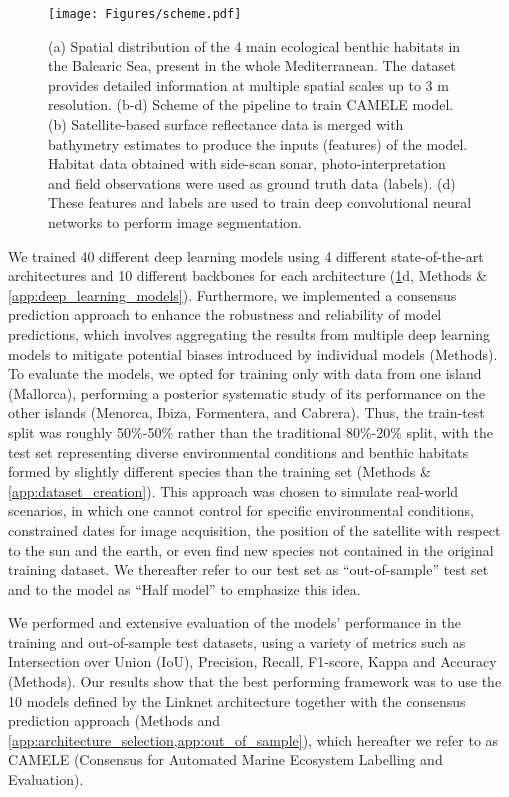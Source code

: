 \begin{figure}[H]
    \centering
    \texttt{[image: Figures/scheme.pdf]}
    \caption{(a) Spatial distribution of the 4 main ecological benthic habitats
        in the Balearic Sea, present in the whole Mediterranean. The dataset
        provides
        detailed information at multiple spatial scales up to 3 m resolution.
        (b-d)
        Scheme of the pipeline to train CAMELE model. (b) Satellite-based
        surface
        reflectance data is merged with bathymetry estimates to produce the
        inputs
        (features) of the model. Habitat data obtained with side-scan sonar,
        photo-interpretation and field observations were used as ground truth
        data
        (labels). (d) These features and labels are used to train deep
        convolutional
        neural networks to perform image segmentation.}
    \label{fig:scheme}
\end{figure}

We trained 40 different deep learning models using 4
different state-of-the-art architectures and 10 different backbones for each
architecture (\cref{fig:scheme}d, Methods \& \cref{app:deep_learning_models}).
Furthermore, we implemented a consensus prediction approach to enhance the
robustness and reliability of model predictions, which involves aggregating the
results from multiple deep learning models to mitigate potential biases
introduced by individual models (Methods). To evaluate the models, we opted for
training only with data from
one island (Mallorca), performing a posterior systematic study of its
performance on the other islands (Menorca, Ibiza, Formentera, and Cabrera).
Thus, the train-test split was roughly 50\%-50\% rather than the traditional
80\%-20\% split, with the test set representing diverse environmental
conditions and benthic habitats formed by slightly different species than
the training set (Methods \& \cref{app:dataset_creation}). This approach
was
chosen to simulate real-world scenarios, in which one cannot control for
specific environmental conditions, constrained dates for image acquisition, the
position of the satellite with respect to the sun and the earth, or even find
new species not contained in the original training dataset. We thereafter refer
to our test set as ``out-of-sample'' test set and to the model as ``Half
model'' to emphasize this idea.

We performed and extensive evaluation of the models' performance in the
training and out-of-sample test datasets, using a variety of metrics such as
Intersection over Union (IoU), Precision, Recall, F1-score, Kappa and Accuracy
(Methods). Our results show that the best performing framework was to use the
10 models defined by the Linknet architecture together with the consensus
prediction approach (Methods and
\cref{app:architecture_selection,app:out_of_sample}), which
hereafter we
refer to as CAMELE (Consensus for Automated Marine Ecosystem Labelling and
Evaluation).

